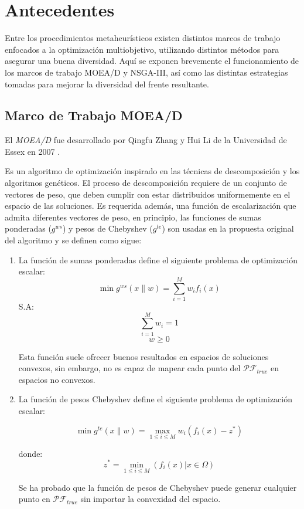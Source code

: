 \documentclass[letterpaper,10pt]{article}
\begin{document}
\section{Antecedentes}

Entre los procedimientos metaheurísticos existen distintos marcos de trabajo enfocados a la optimización multiobjetivo, utilizando distintos métodos para asegurar una buena diversidad.
Aquí se exponen brevemente el funcionamiento de los marcos de trabajo MOEA/D y NSGA-III, así como las distintas estrategias tomadas para mejorar la diversidad del frente resultante.

\subsection{Marco de Trabajo MOEA/D}
El \emph{MOEA/D} fue desarrollado por Qingfu Zhang y Hui Li de la Universidad de Essex en 2007 \cite{4358754}.

Es un algoritmo de optimización inspirado en las técnicas de descomposición y los algoritmos genéticos. El proceso de descomposición requiere de un conjunto de vectores de peso,
que deben cumplir con estar distribuidos uniformemente en el espacio de las soluciones. Es requerida además, una función de escalarización que admita diferentes vectores de peso, en principio,
las funciones de sumas ponderadas  ($g^{ws}$) y pesos de Chebyshev ($g^{te}$) son usadas en la propuesta original del algoritmo y se definen como sigue:

\begin{enumerate}
\item La función de sumas ponderadas define el siguiente problema de optimización escalar:
$$\min g^{ws}(x\|w) = \sum^M_{i=1} w_if_i(x) $$
S.A:
$$ \sum^M_{i=1} w_i = 1$$
$$w \geq 0$$

Esta función suele ofrecer buenos resultados en espacios de soluciones convexos, sin embargo, no es capaz de mapear cada punto del $\mathcal{PF}_{true}$ en espacios no convexos.

\item La función de pesos Chebyshev define el siguiente problema de optimización escalar:

$$\min g^{te}(x\|w) = \max_{1\leq i \leq M} w_i(f_i(x) -z^{*})$$

donde:
$$z^{*}= \min_{1\leq i \leq M} (f_i(x) | x \in \Omega) $$

Se ha probado que la función de pesos de Chebyshev puede generar cualquier punto en $\mathcal{PF}_{true}$ sin importar la convexidad del espacio.
\end{enumerate}
\end{document}
